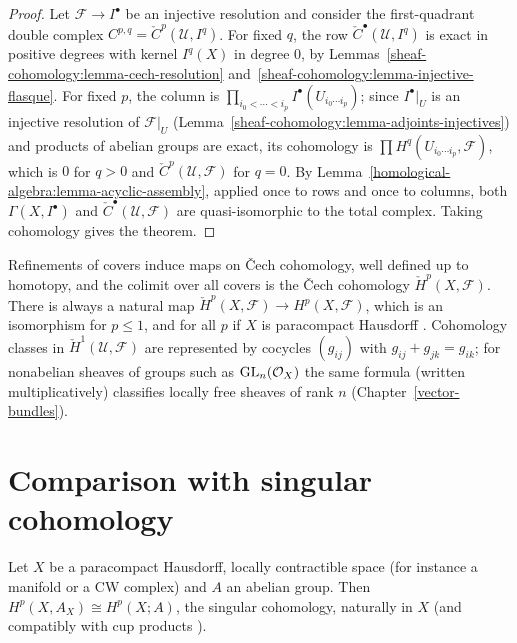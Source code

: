 \begin{proof}
Let $\mathcal{F} \to I^\bullet$ be an injective resolution and consider the first-quadrant double complex $C^{p,q} = \check{C}^p(\mathcal{U}, I^q)$. For fixed $q$, the row
$\check{C}^\bullet(\mathcal{U}, I^q)$ is exact in positive degrees with kernel $I^q(X)$ in degree $0$, by Lemmas~\ref{sheaf-cohomology:lemma-cech-resolution}
and~\ref{sheaf-cohomology:lemma-injective-flasque}. For fixed $p$, the column is $\prod_{i_0 < \cdots < i_p}I^\bullet(U_{i_0 \cdots i_p})$; since $I^\bullet|_U$ is an injective
resolution of $\mathcal{F}|_U$ (Lemma~\ref{sheaf-cohomology:lemma-adjoints-injectives}) and products of abelian groups are exact, its cohomology is
$\prod H^q(U_{i_0 \cdots i_p}, \mathcal{F})$, which is $0$ for $q > 0$ and $\check{C}^p(\mathcal{U}, \mathcal{F})$ for $q = 0$. By Lemma~\ref{homological-algebra:lemma-acyclic-assembly},
applied once to rows and once to columns, both $\Gamma(X, I^\bullet)$ and $\check{C}^\bullet(\mathcal{U}, \mathcal{F})$ are quasi-isomorphic to the total complex. Taking cohomology gives the
theorem.
\end{proof}

\begin{remark}\label{sheaf-cohomology:remark-cech-limit}
Refinements of covers induce maps on \v{C}ech cohomology, well defined up to homotopy, and the colimit over all covers is the \v{C}ech cohomology $\check{H}^p(X, \mathcal{F})$. There
is always a natural map $\check{H}^p(X, \mathcal{F}) \to H^p(X, \mathcal{F})$, which is an isomorphism for $p \leq 1$, and for all $p$ if $X$ is paracompact Hausdorff
\cite[Chapter II, Section 5]{godement-faisceaux}. Cohomology classes in $\check{H}^1(\mathcal{U}, \mathcal{F})$ are represented by cocycles $(g_{ij})$ with $g_{ij} + g_{jk} = g_{ik}$; for
nonabelian sheaves of groups such as $\mathrm{GL}_n(\mathcal{O}_X)$ the same formula (written multiplicatively) classifies locally free sheaves of rank $n$ (Chapter~\ref{vector-bundles}).
\end{remark}

\section{Comparison with singular cohomology}\label{sheaf-cohomology:section-singular}

\begin{theorem}\label{sheaf-cohomology:theorem-singular-comparison}
Let $X$ be a paracompact Hausdorff, locally contractible space (for instance a manifold or a CW complex) and $A$ an abelian group. Then $H^p(X, A_X) \cong H^p(X; A)$, the singular
cohomology, naturally in $X$ (and compatibly with cup products \cite[Chapter III]{bredon-sheaf}).
\end{theorem}

